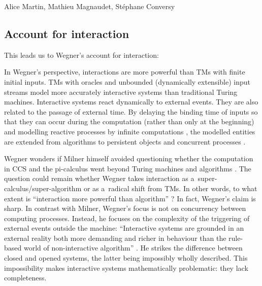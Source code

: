 \begin{artengenv2auth}{Alice Martin, Mathieu Magnaudet, Stéphane Conversy}
\subsection{Account for interaction}

This leads us to Wegner’s account for interaction: 

In Wegner's perspective, interactions are more powerful than TMs with finite initial inputs. TMs with oracles and unbounded (dynamically extensible) input streams model more accurately interactive systems than traditional Turing machines. Interactive systems react dynamically to external events. They are also related to the passage of external time. By delaying the binding time of inputs so that they can occur during the computation (rather than only at the beginning) and modelling reactive processes \parencite{Manna1992} by infinite computations \parencite{Thomas1990}, the modelled entities are extended from algorithms to persistent objects and concurrent processes \parencite{Milner1999}. 

Wegner wonders if Milner himself avoided questioning whether the computation in CCS and the pi-calculus went beyond Turing machines and algorithms \parencite{Wegner2003}. The question could remain whether Wegner takes interaction as a~super-calculus/super-algorithm or as a~radical shift from TMs. In other words, to what extent is ``interaction more powerful than algorithm'' \parencite{Wegner1997}?
In fact, Wegner's claim is sharp. In contrast with Milner, Wegner's focus is not on concurrency between computing processes. Instead, he focuses on the complexity of the triggering of external events outside the machine: ``Interactive systems are grounded in an external reality both more demanding and richer in behaviour than the rule-based world of non-interactive algorithm'' \parencite{Wegner1997}. He strikes the difference between closed and opened systems, the latter being impossibly wholly described. This impossibility makes interactive systems mathematically problematic: they lack completeness. 



\end{artengenv2auth}
